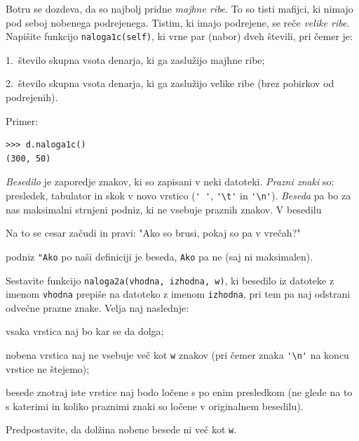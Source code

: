 \documentclass[arhiv]{izpit}
\begin{document}
\podnaloga[10 točk]
Botru se dozdeva, da so najbolj pridne \emph{majhne ribe}. To so tisti mafijci, ki nimajo pod seboj nobenega podrejenega. Tistim, ki imajo podrejene, se reče \emph{velike ribe}. Napišite funkcijo \texttt{naloga1c(self)}, ki vrne par (nabor) dveh števili, pri čemer je:
\begin{compactitem}
\item 1.\ število skupna vsota denarja, ki ga zaslužijo majhne ribe;
\item 2.\ število skupna vsota denarja, ki ga zaslužijo velike ribe (brez pobirkov od podrejenih). 
\end{compactitem}
Primer:
%
\begin{verbatim}
>>> d.naloga1c()
(300, 50)
\end{verbatim}


\emph{Besedilo} je zaporedje znakov, ki so zapisani v neki datoteki. \emph{Prazni znaki} so: presledek, tabulator in skok v novo vrstico (\verb+' '+, \verb+'\t'+ in \verb+'\n'+). \emph{Beseda} pa bo za nas maksimalni strnjeni podniz, ki ne vsebuje praznih znakov. V besedilu
\begin{verbatim*}
Na to se cesar začudi in pravi: "Ako so brusi, pokaj so pa v vrečah?" 
\end{verbatim*}
podniz \verb+"Ako+ po naši definiciji je beseda, \verb+Ako+ pa ne (saj ni maksimalen).

\podnaloga[20 točk]
Sestavite funkcijo \texttt{naloga2a(vhodna, izhodna, w)}, ki besedilo iz datoteke z imenom \texttt{vhodna}
prepiše na datoteko z imenom \texttt{izhodna}, pri tem pa naj odstrani odvečne prazne znake. Velja naj naslednje:
\begin{compactitem}
\item vsaka vrstica naj bo kar se da dolga;
\item nobena vrstica naj ne vsebuje več kot \texttt{w} znakov (pri čemer znaka \verb+'\n'+ na koncu vrstice ne
štejemo);
\item besede znotraj
iste vrstice naj bodo ločene s po enim presledkom (ne glede na to s katerimi in koliko praznimi znaki so
ločene v originalnem besedilu).
\end{compactitem}
Predpostavite, da dolžina nobene besede ni več kot \texttt{w}.
\end{document}
